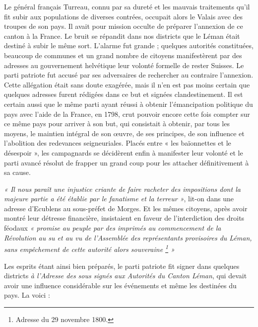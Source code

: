 \documentclass[french,twoside]{book} %
\begin{document}
Le général français Turreau, connu par sa dureté et les mauvais traitements qu’il fit subir aux populations de diverses contrées, occupait alors le Valais avec des troupes de son pays. Il avait pour mission occulte de préparer l’annexion de ce canton à la France. Le bruit se répandit dans nos districts que le Léman était destiné à subir le même sort. L’alarme fut grande ; quelques autorités constituées, beaucoup de communes et un grand nombre de citoyens manifestèrent par des adresses au gouvernement helvétique leur volonté formelle de rester Suisses. Le parti patriote fut accusé par ses adversaires de rechercher au contraire l’annexion. Cette allégation était sans doute exagérée, mais il n’en est pas moins certain que quelques adresses furent rédigées dans ce but et signées clandestinement. Il est certain aussi que le même parti ayant réussi à obtenir l’émancipation politique du pays avec l’aide de la France, en 1798, crut pouvoir encore cette fois compter sur ce même pays pour arriver à son but, qui consistait à obtenir, par tous les moyens, le maintien intégral de son œuvre, de ses principes, de son influence et l’abolition des redevances seigneuriales. Placés entre « les baïonnettes et le désespoir », les campagnards se décidèrent enfin à manifester leur volonté et le parti avancé résolut de frapper un grand coup pour les attacher définitivement à sa cause.\par
\emph{« Il nous paraît une injustice criante de faire racheter des impositions dont la majeure partie a été établie par le fanatisme et la terreur »}, lit-on dans une adresse d’Ecublens au sous-préfet de Morges. Et les mêmes citoyens, après avoir montré leur détresse financière, insistaient en faveur de l’interdiction des droits féodaux \emph{« promise au peuple par des imprimés au commencement de la Révolution au su et au vu de l’Assemblée des représentants provisoires du Léman, sans empêchement de cette autorité alors souveraine \footnote{Adresse du 29 novembre 1800.} »}\par
Les esprits étant ainsi bien préparés, le parti patriote fit signer dans quelques districts \emph{à l’Adresse des sous signés aux Autorités du Canton Léman}, qui devait avoir une influence considérable sur les événements et même les destinées du pays. La voici :\par
\end{document}
